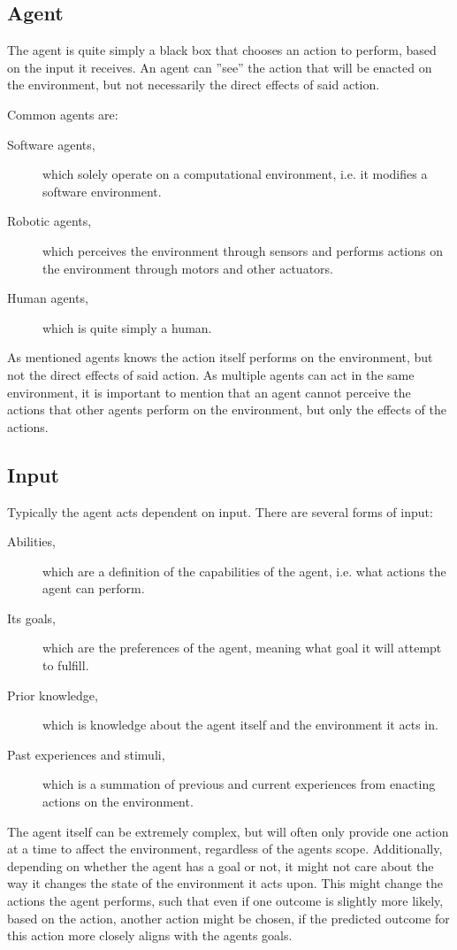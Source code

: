 \subsection{Agent}
The agent is quite simply a black box that chooses an action to perform, based on the input it receives.
An agent can ''see'' the action that will be enacted on the environment, but not necessarily the direct effects of said action.

Common agents are: 
\begin{description}
    \item[Software agents,]which solely operate on a computational environment, i{.}e{.} it modifies a software environment.
    \item[Robotic agents,]which perceives the environment through sensors and performs actions on the environment through motors and other actuators.
    \item[Human agents,]which is quite simply a human. 
\end{description}
As mentioned agents knows the action itself performs on the environment, but not the direct effects of said action.
As multiple agents can act in the same environment, it is important to mention that an agent cannot perceive the actions that other agents perform on the environment, but only the effects of the actions.

\subsection{Input}
Typically the agent acts dependent on input.
There are several forms of input:

\begin{description}
    \item[Abilities,]which are a definition of the capabilities of the agent, i{.}e{.} what actions the agent can perform.
    \item[Its goals,]which are the preferences of the agent, meaning what goal it will attempt to fulfill.
    \item[Prior knowledge,]which is knowledge about the agent itself and the environment it acts in.
    \item[Past experiences and stimuli,]which is a summation of previous and current experiences from enacting actions on the environment.   
\end{description}
The agent itself can be extremely complex, but will often only provide one action at a time to affect the environment, regardless of the agents scope.
Additionally, depending on whether the agent has a goal or not, it might not care about the way it changes the state of the environment it acts upon.
This might change the actions the agent performs, such that even if one outcome is slightly more likely, based on the action, another action might be chosen, if the predicted outcome for this action more closely aligns with the agents goals.


